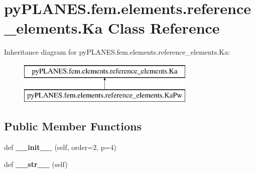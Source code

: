 \hypertarget{classpy_p_l_a_n_e_s_1_1fem_1_1elements_1_1reference__elements_1_1_ka}{}\section{py\+P\+L\+A\+N\+E\+S.\+fem.\+elements.\+reference\+\_\+elements.\+Ka Class Reference}
\label{classpy_p_l_a_n_e_s_1_1fem_1_1elements_1_1reference__elements_1_1_ka}
Inheritance diagram for py\+P\+L\+A\+N\+E\+S.\+fem.\+elements.\+reference\+\_\+elements.\+Ka\+:\begin{figure}[H]
\begin{center}
\leavevmode
\includegraphics[height=2.000000cm]{classpy_p_l_a_n_e_s_1_1fem_1_1elements_1_1reference__elements_1_1_ka}
\end{center}
\end{figure}
\subsection*{Public Member Functions}
\begin{DoxyCompactItemize}
\item 
\mbox{\label{classpy_p_l_a_n_e_s_1_1fem_1_1elements_1_1reference__elements_1_1_ka_aa84d62a2568dc8adbb70518e94cedfcd}} 
def {\bfseries \+\_\+\+\_\+init\+\_\+\+\_\+} (self, order=2, p=4)
\item 
\mbox{\label{classpy_p_l_a_n_e_s_1_1fem_1_1elements_1_1reference__elements_1_1_ka_a98008c414e90180338adb6cdf8327e29}} 
def {\bfseries \+\_\+\+\_\+str\+\_\+\+\_\+} (self)
\end{DoxyCompactItemize}

